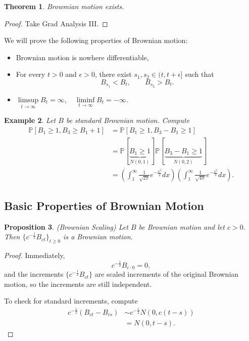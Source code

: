 \documentclass{tufte-handout}
\renewcommand*\P{\mathbb{P}}
\newtheorem{thm}{Theorem}[subsection]
\newtheorem{ex}[thm]{Example}
\newtheorem{prop}[thm]{Proposition}
\theoremstyle{definition}
\begin{document}
\begin{thm}
	Browmian motion exists.
\end{thm}

\begin{proof}
	Take Grad Analysis III.	
\end{proof}

We will prove the following properties of Brownian motion:
\begin{itemize}
	\item Brownian motion is nowhere differentiable, 
	\item For every $t >0$ and $\epsilon > 0$, there exist $s_1,s_2 \in (t,t+\epsilon]$ such that \[
			B_{s_1} < B_t, \qquad B_{s_2} > B_t
	.\] 
	\item $\limsup\limits_{t \to \infty} B_t = \infty, \quad \liminf\limits_{t \to \infty} B_t = -\infty$.
\end{itemize}

\begin{ex}
	Let $B$ be standard Brownian motion. Compute
	\begin{align*}
		\P\left[B_1 \ge 1, B_3 \ge B_1 + 1\right] &= \P\left[B_1 \ge 1, B_3 - B_1 \ge 1\right]  \\
												  &= \P\left[\underbrace{B_1 \ge 1}_{N(0,1)}\right] \P\left[\underbrace{B_3 - B_1 \ge 1}_{N(0,2)}\right]  \\
		&= \left( \int_{1}^{\infty} \frac{1}{\sqrt{2\pi} } e^{-\frac{x^2}{2}}dx  \right) \left( \int_{1}^{\infty} \frac{1}{\sqrt{4\pi} } e^{-\frac{x^2}{3}}dx  \right)
	.\end{align*}
\end{ex}

\subsection{Basic Properties of Brownian Motion}
\begin{prop}
	(Brownian Scaling) Let $B$ be Brownian motion and let $c >0$.
	Then $\{c^{-\frac{1}{2}} B_{ct}\}_{t \ge 0}$ is a Brownian motion.
\end{prop}

\begin{proof}
	Immediately, \[
		c^{-\frac{1}{2}}B_{c \cdot 0} = 0
	,\] and the increments $\{c^{-\frac{1}{2}} B_{ct}\}$ are scaled increments of the original Brownian motion, so the increments are still independent.

	To check for standard increments, compute
	\begin{align*}
		c^{-\frac{1}{2}} \left( B_{ct} - B_{cs} \right) &\sim  c^{-\frac{1}{2}} N(0, c(t-s)) \\
														&= N(0,t-s)
	.\end{align*}
\end{proof}
\end{document}
